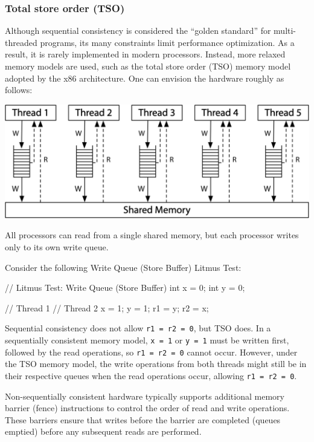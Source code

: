 \documentclass[fontsize=10pt, oneside]{scrartcl}
\newcommand{\monobox}[1]{\mbox{\texttt{#1}}}
\begin{document}
\subsubsection{Total store order (TSO)}

Although sequential consistency is considered the ``golden standard'' for multi-threaded programs, its many constraints limit performance optimization.
As a result, it is rarely implemented in modern processors.
Instead, more relaxed memory models are used, such as the total store order (TSO) memory model adopted by the x86 architecture.
One can envision the hardware roughly as follows:

\begin{center}
\includegraphics[keepaspectratio,width=0.7\linewidth]{images/hw-tso}
\label{hw-tso}
\end{center}

All processors can read from a single shared memory, but each processor writes only to its own write queue.

Consider the following Write Queue (Store Buffer) Litmus Test:

\begin{ccode}
// Litmus Test: Write Queue (Store Buffer)
int x = 0;
int y = 0;

// Thread 1        // Thread 2
x = 1;             y = 1;
r1 = y;            r2 = x;
\end{ccode}

Sequential consistency does not allow \monobox{r1 = r2 = 0}, but TSO does.
In a sequentially consistent memory model, \monobox{x = 1} or \monobox{y = 1} must be written first, followed by the read operations, so \monobox{r1 = r2 = 0} cannot occur.
However, under the TSO memory model, the write operations from both threads might still be in their respective queues when the read operations occur, allowing \monobox{r1 = r2 = 0}.

Non-sequentially consistent hardware typically supports additional memory barrier (fence) instructions to control the order of read and write operations.
These barriers ensure that writes before the barrier are completed (queues emptied) before any subsequent reads are performed.
\end{document}
